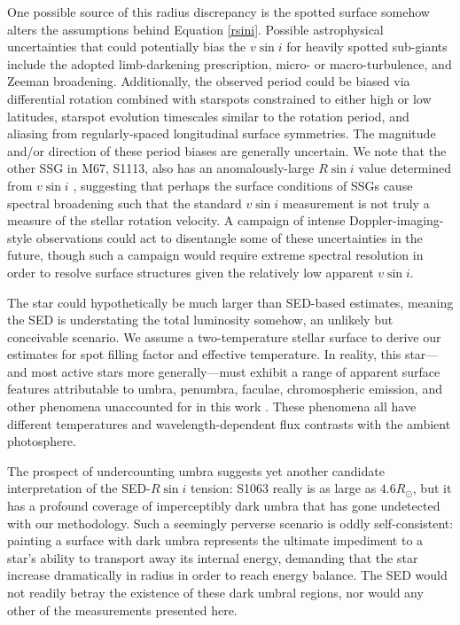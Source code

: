 \documentclass[trackchanges]{aastex631}
\begin{document}
One possible source of this radius discrepancy is the spotted surface somehow alters the assumptions behind Equation \ref{rsini}. Possible astrophysical uncertainties that could potentially bias the $v\sin{i}$ for heavily spotted sub-giants include the adopted limb-darkening prescription, micro- or macro-turbulence, and Zeeman broadening. Additionally, the observed period could be biased via differential rotation combined with starspots constrained to either high or low latitudes, starspot evolution timescales similar to the rotation period, and aliasing from regularly-spaced longitudinal surface symmetries. The magnitude and/or direction of these period biases are generally uncertain. We note that the other SSG in M67, S1113, also has an anomalously-large $R\sin{i}$ value determined from $v\sin{i}$ \citep{mathieu03}, suggesting that perhaps the surface conditions of SSGs cause spectral broadening such that the standard $v\sin{i}$ measurement is not truly a measure of the stellar rotation velocity. A campaign of intense Doppler-imaging-style observations could act to disentangle some of these uncertainties in the future, though such a campaign would require extreme spectral resolution in order to resolve surface structures given the relatively low apparent $v\sin{i}$.

The star could hypothetically be much larger than SED-based estimates, meaning the SED is understating the total luminosity somehow, an unlikely but conceivable scenario.  We assume a two-temperature stellar surface to derive our estimates for spot filling factor and effective temperature.  In reality, this star---and most active stars more generally---must exhibit a range of apparent surface features attributable to umbra, penumbra, faculae, chromospheric emission, and other phenomena unaccounted for in this work \citep{berdyugina05, 2009A&ARv..17..251S}. These phenomena all have different temperatures and wavelength-dependent flux contrasts with the ambient photosphere.

The prospect of undercounting umbra suggests yet another candidate interpretation of the SED-$R\sin{i}$ tension: S1063 really is as large as $4.6 R_{\odot}$, but it has a profound coverage of imperceptibly dark umbra that has gone undetected with our methodology.  Such a seemingly perverse scenario is oddly self-consistent: painting a surface with dark umbra represents the ultimate impediment to a star's ability to transport away its internal energy, demanding that the star increase dramatically in radius in order to reach energy balance.  The SED would not readily betray the existence of these dark umbral regions, nor would any other of the measurements presented here.
\end{document}
